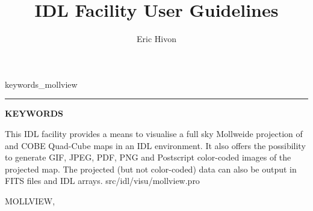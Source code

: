 

\sloppy

\title{\healpix IDL Facility User Guidelines}
 \section[mollview]{ }
\label{idl:\thedocid}
\author{Eric Hivon}



  \newenvironment{qualifiers_mollview}
    {\rule{\hsize}{0.7mm}
     \textsc{\Large{\textbf{QUALIFIERS}}}\hfill\newline%
	\renewcommand{\arraystretch}{1.5}%
	}

  \newenvironment{keywords_mollview}
    {\rule{\hsize}{0.7mm}
     \textsc{\Large{\textbf{KEYWORDS}}}\hfill\newline%
	\renewcommand{\arraystretch}{1.5}%
	}


\newcommand{\sizeone}{0.19\hsize}
\newcommand{\sizetwo}{0.08\hsize}
\newcommand{\sizethr}{0.70\hsize}

\begin{facility}
{This IDL facility provides a means to visualise a full sky Mollweide projection of
\healpix and COBE Quad-Cube maps in an IDL environment. 
It also offers the possibility to
generate GIF, JPEG, PDF, PNG and Postscript color-coded images of the projected map. 
The projected (but not color-coded) data can also be output in FITS files and
IDL arrays.}
{src/idl/visu/mollview.pro}
\end{facility}

\newcommand{\mollbacktotop}{\latexhtml{%
}{
\mylink{idl:mollview:TOP}{Back to Format}%
}}


\begin{IDLformat}
{MOLLVIEW, %
%
\normalsize{
}
}
\end{IDLformat}

